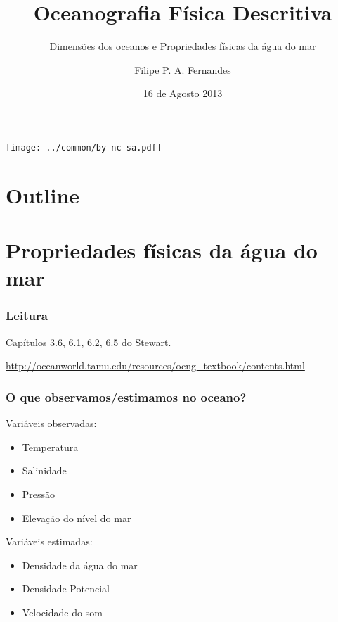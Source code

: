 
\title[Aula 02]{Oceanografia Física Descritiva}
\subtitle{Dimensões dos oceanos e Propriedades físicas da água do mar}
\author[Filipe Fernandes]{Filipe P. A. Fernandes}
\date[Agosto 2013]{16 de Agosto 2013}




\begin{frame}[plain]
  \titlepage
    \begin{center}
    \texttt{[image: ../common/by-nc-sa.pdf]}
  \end{center}
\end{frame}

\section*{Outline}
\begin{frame}
\tableofcontents
\end{frame}


\section{Propriedades físicas da água do mar}
\begin{frame}
\frametitle{Leitura}
    \begin{block}{}
        Capítulos 3.6, 6.1, 6.2, 6.5 do Stewart.

        \small{\url{http://oceanworld.tamu.edu/resources/ocng_textbook/contents.html}}
    \end{block}
\end{frame}

\begin{frame}
\frametitle{O que observamos/estimamos no oceano?}
Variáveis observadas:
    \small{
    {\bf
    \begin{itemize}[<+-| alert@+>]
    \item Temperatura
    \item Salinidade
    \item Pressão
    \item Elevação do nível do mar
    \end{itemize}
    }}
    \pause
Variáveis estimadas:
    \small{
    \begin{itemize}[<+-| alert@+>]
    \item Densidade da água do mar
    \item Densidade Potencial
    \item Velocidade do som
    \end{itemize}
    }
\end{frame}


